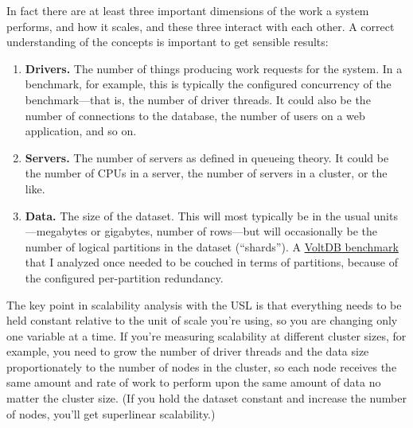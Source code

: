 \documentclass{vivid_layout}
\begin{document}
In fact there are at least three important dimensions of the work a system
performs, and how it scales, and these three interact with each other. A correct
understanding of the concepts is important to get sensible results:

\begin{enumerate}
\item {\bfseries Drivers.} The number of things producing work requests for the
system. In a benchmark, for example, this is typically the configured
concurrency of the benchmark---that is, the number of driver threads. It could
also be the number of connections to the database, the number of users on a web
application, and so on.
\item {\bfseries Servers.} The number of servers as defined in queueing theory. It could be the
number of CPUs in a server, the number of servers in a cluster, or the like.
\item {\bfseries Data.} The size of the dataset. This will most typically be in the usual
units---megabytes or gigabytes, number of rows---but will occasionally be the
number of logical partitions in the dataset (``shards''). A
\href{https://www.percona.com/blog/2011/02/28/is-voltdb-really-as-scalable-as-they-claim/}{VoltDB
benchmark} that I analyzed once needed to be couched in terms of partitions,
because of the configured per-partition redundancy.
\end{enumerate}

The key point in scalability analysis with the USL is that everything needs to be held
constant relative to the unit of scale you're using, so you are changing only
one variable at a time. If you're measuring scalability at different cluster
sizes, for example, you need to grow the number of driver threads and the data
size proportionately to the number of nodes in the cluster, so each node
receives the same amount and rate of work to perform upon the same amount of
data no matter the cluster size. (If you hold the dataset constant and increase
the number of nodes, you'll get superlinear scalability.)
\end{document}
